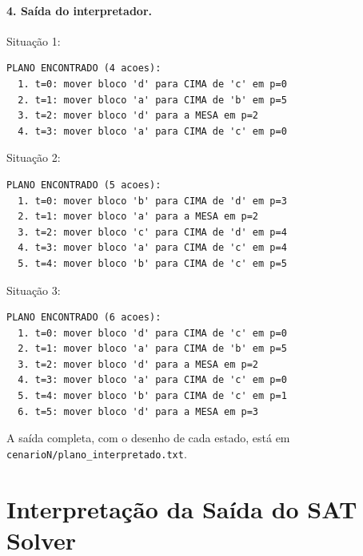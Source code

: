 \documentclass[11pt,a4paper]{article}
\begin{document}
\paragraph{4. Saída do interpretador.} Situação 1:
\begin{lstlisting}
PLANO ENCONTRADO (4 acoes):
  1. t=0: mover bloco 'd' para CIMA de 'c' em p=0
  2. t=1: mover bloco 'a' para CIMA de 'b' em p=5
  3. t=2: mover bloco 'd' para a MESA em p=2
  4. t=3: mover bloco 'a' para CIMA de 'c' em p=0
\end{lstlisting}
Situação 2:
\begin{lstlisting}
PLANO ENCONTRADO (5 acoes):
  1. t=0: mover bloco 'b' para CIMA de 'd' em p=3
  2. t=1: mover bloco 'a' para a MESA em p=2
  3. t=2: mover bloco 'c' para CIMA de 'd' em p=4
  4. t=3: mover bloco 'a' para CIMA de 'c' em p=4
  5. t=4: mover bloco 'b' para CIMA de 'c' em p=5
\end{lstlisting}
Situação 3:
\begin{lstlisting}
PLANO ENCONTRADO (6 acoes):
  1. t=0: mover bloco 'd' para CIMA de 'c' em p=0
  2. t=1: mover bloco 'a' para CIMA de 'b' em p=5
  3. t=2: mover bloco 'd' para a MESA em p=2
  4. t=3: mover bloco 'a' para CIMA de 'c' em p=0
  5. t=4: mover bloco 'b' para CIMA de 'c' em p=1
  6. t=5: mover bloco 'd' para a MESA em p=3
\end{lstlisting}
A saída completa, com o desenho de cada estado, está em
\texttt{cenarioN/plano\_interpretado.txt}.

\section{Interpretação da Saída do SAT Solver}
\label{sec:interp}
\end{document}
